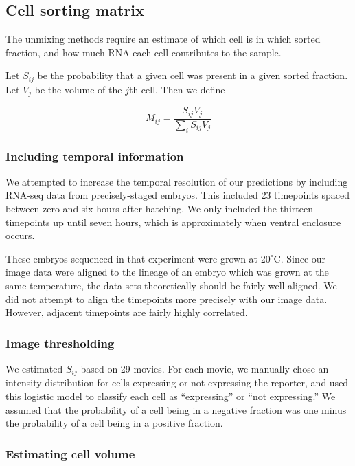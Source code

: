 \documentclass{article}
\begin{document}
\subsection*{Cell sorting matrix}

The unmixing methods require an estimate of which cell is in which sorted fraction,
and how much RNA each cell contributes to the sample.

Let $S_{ij}$ be
the probability that a given cell was present in a given sorted fraction. Let $V_j$
be the volume of the $j$th cell. Then we define

\[
M_{ij} = \frac{S_{ij} V_j}{ \sum\limits_{i}^{} S_{ij} V_j }
\]

\subsubsection*{Including temporal information}

We attempted to increase the temporal resolution of our predictions
by including RNA-seq data from precisely-staged embryos.
This included 23 timepoints spaced between zero and six hours after hatching.
We only included the thirteen timepoints up until seven hours, which is
approximately when ventral enclosure occurs.

These embryos sequenced in that experiment were grown at $20^{\circ}$C.
Since our image data were aligned to the lineage of an embryo which was
grown at the same temperature, the data sets theoretically should be fairly
well aligned.
We did not attempt to align the timepoints more precisely with our
image data. However, adjacent timepoints are fairly highly correlated.

\subsubsection*{Image thresholding}

We estimated $S_{ij}$ based on 29 movies.
For each movie, we manually chose an intensity distribution for cells expressing
or not expressing the reporter, and 
used this logistic model to classify each cell as ``expressing'' or ``not expressing.''
We assumed that the probability of a cell being in a negative fraction was
one minus the probability of a cell being in a positive fraction.

\subsubsection*{Estimating cell volume}
\end{document}
